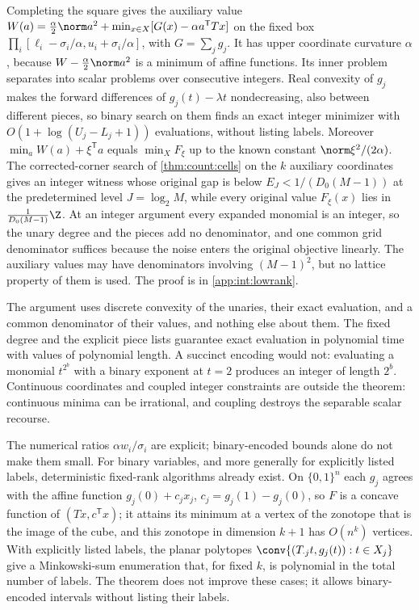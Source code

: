 Completing the square gives the auxiliary value
$W(a)=\frac\alpha2\norm a^2+\min_{x\in X}[G(x)-\alpha a^{\mathsf T}Tx]$ on the
fixed box $\prod_i[\ell_i-\sigma_i/\alpha,u_i+\sigma_i/\alpha]$, with
$G=\sum_jg_j$. It has upper coordinate curvature $\alpha$, because
$W-\frac\alpha2\norm a^2$ is a minimum of affine functions. Its inner problem
separates into scalar problems over consecutive integers. Real convexity of
$g_j$ makes the forward differences of $g_j(t)-\lambda t$ nondecreasing, also
between different pieces, so binary search on them finds an exact integer
minimizer with $O(1+\log(U_j-L_j+1))$ evaluations, without listing labels.
Moreover $\min_aW(a)+\xi^{\mathsf T}a$ equals $\min_XF_\xi$ up to the known
constant $\norm\xi^2/(2\alpha)$. The corrected-corner search of
\cref{thm:count:cells} on the $k$ auxiliary coordinates gives an integer
witness whose original gap is below $E_J<1/(D_0(M-1))$ at the predetermined
level $J=\log_2M$, while every original value $F_\xi(x)$ lies in
$\frac1{D_0(M-1)}\Z$. At an integer argument every expanded monomial is an
integer, so the unary degree and the pieces add no denominator, and one
common grid denominator suffices because the noise enters the original
objective linearly. The auxiliary values may have denominators involving
$(M-1)^2$, but no lattice property of them is used. The proof is in
\cref{app:int:lowrank}.

The argument uses discrete convexity of the unaries, their exact evaluation,
and a common denominator of their values, and nothing else about them. The
fixed degree and the explicit piece lists guarantee exact evaluation in
polynomial time with values of polynomial length. A succinct encoding would
not: evaluating a monomial $t^{2^b}$ with a binary exponent at $t=2$
produces an integer of length $2^b$. Continuous coordinates and coupled
integer constraints are outside the theorem: continuous minima can be
irrational, and coupling destroys the separable scalar recourse.

The numerical ratios $\alpha w_i/\sigma_i$ are explicit; binary-encoded bounds
alone do not make them small. For binary variables, and more generally for
explicitly listed labels, deterministic fixed-rank algorithms already exist. On
$\{0,1\}^n$ each $g_j$ agrees with the affine function $g_j(0)+c_jx_j$,
$c_j=g_j(1)-g_j(0)$, so $F$ is a concave
function of $(Tx,c^{\mathsf T}x)$; it attains its minimum at a vertex of the
zonotope that is the image of the cube, and this zonotope in dimension $k+1$
has $O(n^k)$ vertices. With explicitly listed labels, the planar polytopes
$\conv\{(T_{\cdot j}t,g_j(t)):t\in X_j\}$ give a Minkowski-sum enumeration
that, for fixed $k$, is polynomial in the total number of labels. The theorem
does not improve these cases; it allows binary-encoded intervals without listing
their labels.

